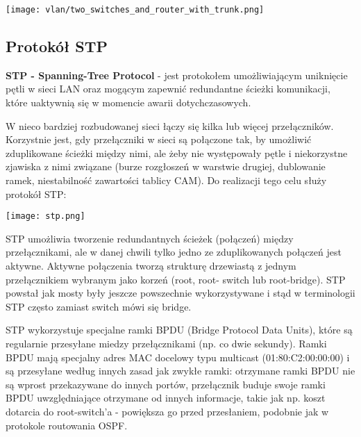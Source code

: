 \documentclass[main.tex]{subfiles}
\begin{document}
    \bigskip
    \texttt{[image: vlan/two\_switches\_and\_router\_with\_trunk.png]}


    \subsection{Protokół STP}
    \textbf{STP - Spanning-Tree Protocol} - jest protokołem umożliwiającym uniknięcie pętli w sieci LAN oraz mogącym zapewnić redundantne ścieżki komunikacji,
    które uaktywnią się w momencie awarii dotychczasowych.

    W nieco bardziej rozbudowanej sieci łączy się kilka lub więcej przełączników. Korzystnie jest,
    gdy przełączniki w sieci są połączone tak, by umożliwić zduplikowane ścieżki między nimi, ale
    żeby nie występowały pętle i niekorzystne zjawiska z nimi związane (burze rozgłoszeń w
    warstwie drugiej, dublowanie ramek, niestabilność zawartości tablicy CAM). Do realizacji
    tego celu służy protokół STP:

    \bigskip
    \texttt{[image: stp.png]}
    \smallskip

    STP umożliwia tworzenie redundantnych ścieżek (połączeń) między przełącznikami, ale w
    danej chwili tylko jedno ze zduplikowanych połączeń jest aktywne. Aktywne połączenia
    tworzą strukturę drzewiastą z jednym przełącznikiem wybranym jako korzeń (root, root- switch lub root-bridge).
    STP powstał jak mosty były jeszcze powszechnie wykorzystywane i stąd w terminologii STP często zamiast switch mówi się bridge.

    STP wykorzystuje specjalne ramki BPDU (Bridge Protocol Data Units), które są regularnie
    przesyłane miedzy przełącznikami (np. co dwie sekundy). Ramki BPDU mają specjalny adres
    MAC docelowy typu multicast (01:80:C2:00:00:00) i są przesyłane według innych zasad jak
    zwykłe ramki: otrzymane ramki BPDU nie są wprost przekazywane do innych portów,
    przełącznik buduje swoje ramki BPDU uwzględniające otrzymane od innych informacje,
    takie jak np. koszt dotarcia do root-switch'a - powiększa go przed przesłaniem,
    podobnie jak w protokole routowania OSPF. \\
\end{document}
